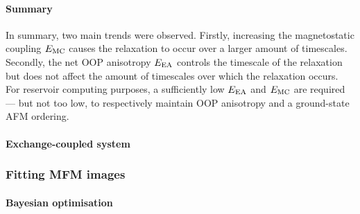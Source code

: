\paragraph{Summary}
In summary, two main trends were observed.
Firstly, increasing the magnetostatic coupling $E_\mathrm{MC}$ causes the relaxation to occur over a larger amount of timescales.
Secondly, the net OOP anisotropy $E_\mathrm{EA}$ controls the timescale of the relaxation but does not affect the amount of timescales over which the relaxation occurs.
For reservoir computing purposes, a sufficiently low $E_\mathrm{EA}$ and $E_\mathrm{MC}$ are required --- but not too low, to respectively maintain OOP anisotropy and a ground-state AFM ordering.


\paragraph{Exchange-coupled system} %
\subsubsection{Fitting MFM images}\label{sec:3:OOP:MFM}
\paragraph{Bayesian optimisation}
